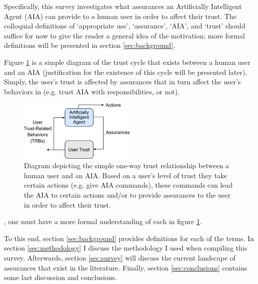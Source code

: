     Specifically, this survey investigates what assurances an Artificially Intelligent Agent (AIA) can provide to a human user in order to affect their trust. The colloquial definitions of `appropriate use', `assurance', `AIA', and `trust' should suffice for now to give the reader a general idea of the motivation; more formal definitions will be presented in section \ref{sec:background}.

    Figure \ref{fig:SimpleTrust_one_way} is a simple diagram of the trust cycle that exists between a human user and an AIA (justification for the existence of this cycle will be presented later). Simply, the user's trust is affected by assurances that in turn affect the user's behaviors in  (e.g. trust AIA with responsibilities, or not).

    \begin{figure}
        \centering
        \includegraphics[width=0.5\textwidth]{Figures/SimpleTrust_one_way.png}
        \caption{Diagram depicting the simple one-way trust relationship between a human user and an AIA. Based on a user's level of trust they take certain actions (e.g. give AIA commands), these commands can lead the AIA to certain actions and/or to provide assurances to the user in order to affect their trust.}
        \label{fig:SimpleTrust_one_way}
    \end{figure}

    , one must have a more formal understanding of each  in figure \ref{fig:SimpleTrust_one_way}. %
   
   
   To this end, section \ref{sec:background} provides definitions for each of the terms. In section \ref{sec:methodology} I discuss the methodology I used when compiling this survey. Afterwards, section \ref{sec:survey} will discuss the current landscape of assurances that exist in the literature. Finally, section \ref{sec:conclusions} contains some last discussion and conclusions.
